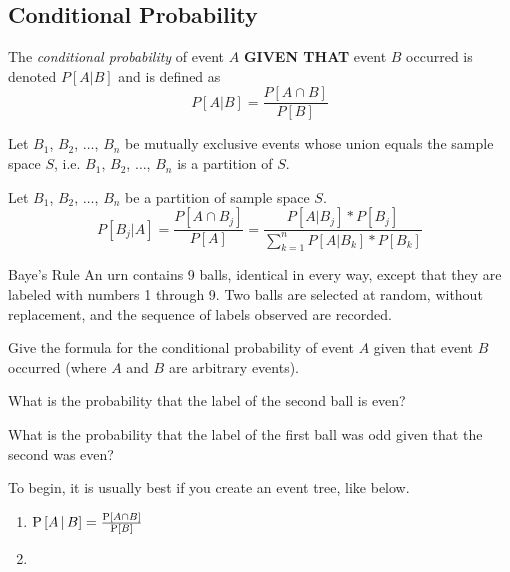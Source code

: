\subsection{Conditional Probability}\label{subsec:Conditional Probability}
\begin{definition}\label{def:Conditional Probability}
  The \emph{conditional probability} of event $A$ \textbf{GIVEN THAT} event $B$ occurred is denoted $P \left[ A \vert B \right]$ and is defined as
  \begin{equation}\label{eq:Conditional Probability}
    P \left[ A \vert B \right] = \frac{P \left[ A \cap B \right]}{P \left[ B \right]}
  \end{equation}
\end{definition}
\begin{theorem}\label{thm:Theorem of Total Probability}
  Let $B_{1}$, $B_{2}$, $\ldots$, $B_{n}$ be mutually exclusive events whose union equals the sample space $S$, i.e. $B_{1}$, $B_{2}$, $\ldots$, $B_{n}$ is a partition of $S$.
\end{theorem}
\begin{definition}\label{def:Baye's Rule}
  Let $B_{1}$, $B_{2}$, $\ldots$, $B_{n}$ be a partition of sample space $S$.
  \begin{equation}
    P \left[ B_{j} \vert A \right] = \frac{P \left[ A \cap B_{j} \right]}{P \left[ A \right]}
    = \frac{P \left[ A \vert B_{j} \right] * P \left[ B_{j} \right]}{\sum\limits_{k=1}^{n} P \left[ A \vert B_{k} \right] * P \left[ B_{k} \right]}
  \end{equation}
\end{definition}
\begin{example}{Baye's Rule}
  An urn contains 9 balls, identical in every way, except that they are labeled with numbers 1 through 9.
  Two balls are selected at random, without replacement, and the sequence of labels observed are recorded.
  \begin{boldalphlist}
  \item Give the formula for the conditional probability of event $A$ given that event $B$ occurred (where $A$ and $B$ are arbitrary events).
  \item What is the probability that the label of the second ball is even?
  \item What is the probability that the label of the first ball was odd given that the second was even?
  \end{boldalphlist}

  \tcblower
  To begin, it is usually best if you create an event tree, like below.
  \newline
  \begin{center}
    
  \end{center}
  \begin{enumerate}[label=(\alph*)]
  \item $\operatorname{\operatorname{P}} \left[ A \operatorname{\vert} B \right] = \frac{\operatorname{\operatorname{P}} \left[ A \cap B \right]}{\operatorname{\operatorname{P}} \left[ B \right]}$
  \item
  \end{enumerate}
\end{example}


